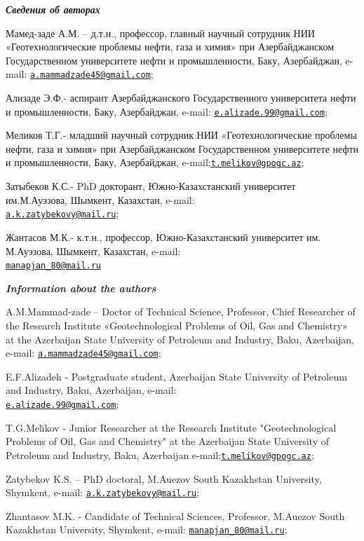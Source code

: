\begin{authorinfo}
\emph{{\bfseries Сведения об авторах}}

Мамед-заде А.М. -- д.т.н., профессор, главный научный сотрудник НИИ
«Геотехнологические проблемы нефти, газа и химия» при Азербайджанском
Государственном университете нефти и промышленности, Баку, Азербайджан,
e-mail:
\href{mailto:a.mammadzade45@gmail.com}{\nolinkurl{a.mammadzade45@gmail.com}};

Ализаде Э.Ф.- аспирант Азербайджанского Государственного университета
нефти и промышленности, Баку, Азербайджан, e-mail:
\href{mailto:e.alizade.99@gmail.com}{\nolinkurl{e.alizade.99@gmail.com}};

Меликов Т.Г.- младший научный сотрудник НИИ «Геотехнологические проблемы
нефти, газа и химия» при Азербайджанском Государственном университете
нефти и промышленности, Баку, Азербайджан,
e-mail:\href{mailto:t.melikov@gpogc.az}{\nolinkurl{t.melikov@gpogc.az}};

Затыбеков К.С.- PhD докторант, Южно-Казахстанский университет
им.М.Ауэзова, Шымкент, Казахстан, e-mail:\\
\href{mailto:a.k.zatybekovy@mail.ru}{\nolinkurl{a.k.zatybekovy@mail.ru}};

Жантасов М.К.- к.т.н., профессор, Южно-Казахстанский университет им.
М.Ауэзова, Шымкент, Казахстан,
e-mail:\\\href{mailto:manapjan_80@mail.ru}{\nolinkurl{manapjan\_80@mail.ru}}

\emph{{\bfseries Information about the authors}}

A.M.Mammad-zade -- Doctor of Technical Science, Professor, Chief
Researcher of the Research Institute «Geotechnological Problems of Oil,
Gas and Chemistry» at the Azerbaijan State University of Petroleum and
Industry, Baku, Azerbaijan, e-mail:
\href{mailto:a.mammadzade45@gmail.com}{\nolinkurl{a.mammadzade45@gmail.com}};

E.F.Alizadeh - Postgraduate student, Azerbaijan State University of
Petroleum and Industry, Baku, Azerbaijan, e-mail:\\
\href{mailto:e.alizade.99@gmail.com}{\nolinkurl{e.alizade.99@gmail.com}};

T.G.Melikov - Junior Researcher at the Research Institute
"Geotechnological Problems of Oil, Gas and Chemistry" at the Azerbaijan
State University of Petroleum and Industry, Baku, Azerbaijan
e-mail:\href{mailto:t.melikov@gpogc.az}{\nolinkurl{t.melikov@gpogc.az}};

Zatybekov K.S. -- PhD doctoral, M.Auezov South Kazakhstan University,
Shymkent, e-mail:
\href{mailto:a.k.zatybekovy@mail.ru}{\nolinkurl{a.k.zatybekovy@mail.ru}};

Zhantasov M.K. - Candidate of Technical Sciences, Professor, M.Auezov
South Kazakhstan University, Shymkent, e-mail:
\href{mailto:manapjan_80@mail.ru}{\nolinkurl{manapjan\_80@mail.ru}};
\end{authorinfo}
